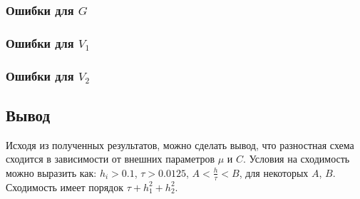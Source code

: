 \newpage

\subsubsection{Ошибки для $G$}


\subsubsection{Ошибки для $V_1$}


\subsubsection{Ошибки для $V_2$}



\subsection{Вывод}
Исходя из полученных результатов, можно сделать вывод, что разностная схема сходится в зависимости от внешних параметров $\mu$ и $C$. Условия на сходимость можно выразить как: $h_i > 0.1$, $\tau > 0.0125$, $A < \frac{h}{\tau} < B$, для некоторых $A$, $B$.  Сходимость имеет порядок $\tau + h_1^2 + h_2^2$.

\newpage
